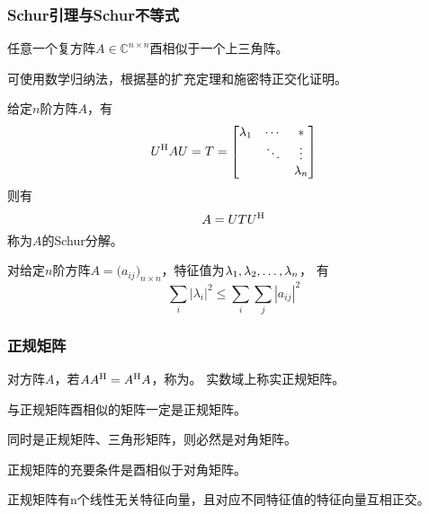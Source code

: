 \subsubsection{Schur引理与Schur不等式}

\begin{theorem}[Schur引理]
    任意一个复方阵$A\in \mathbb{C}^{n\times n}$酉相似于一个上三角阵。
\end{theorem}
可使用数学归纳法，根据基的扩充定理和施密特正交化证明。

\begin{definition}
    给定$n$阶方阵$A$，有
    \[
        U^\mathrm{H} AU= T=
        \begin{bmatrix}
            \lambda_1 & \cdots & *\\
            & \ddots & \vdots \\
            && \lambda_n \\
        \end{bmatrix}
    \]
    则有
    \[
        A=UTU^\mathrm{H}
    \]
    称为$A$的Schur分解。
\end{definition}

\begin{theorem}[Schur不等式]
    对给定$n$阶方阵$A=\Big(a_{ij}\Big)_{n\times n}$，特征值为$\VectorComma{\lambda}{n}$，
    有
    \[
        \sum_i |\lambda_i|^2 \leq \sum_i \sum_j |a_{ij}|^2
    \]
\end{theorem}

\subsubsection{正规矩阵}

\begin{definition}[正规矩阵]
    对方阵$A$，若$AA^\mathrm{H}=A^\mathrm{H} A$，称为。
    实数域上称实正规矩阵。
\end{definition}

\begin{lemma}
    与正规矩阵酉相似的矩阵一定是正规矩阵。
\end{lemma}

\begin{lemma}
    同时是正规矩阵、三角形矩阵，则必然是对角矩阵。
\end{lemma}

\begin{theorem}
    正规矩阵的充要条件是酉相似于对角矩阵。
\end{theorem}

\begin{corollary}
    正规矩阵有n个线性无关特征向量，且对应不同特征值的特征向量互相正交。
\end{corollary}

